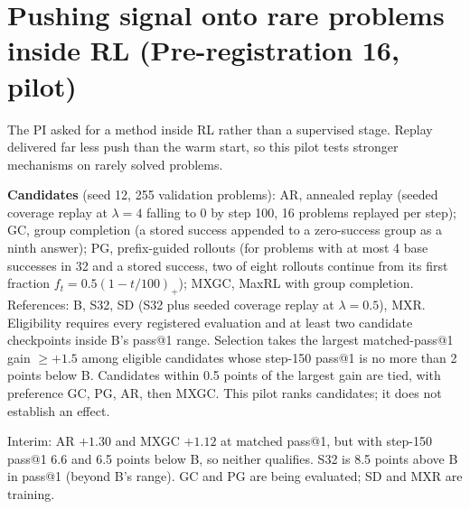 \documentclass[11pt]{article}
\begin{document}
\section{Pushing signal onto rare problems inside RL (Pre-registration 16, pilot)}
\begin{why}
The PI asked for a method inside RL rather than a supervised stage. Replay delivered far less push than the warm start, so this pilot tests stronger mechanisms on rarely solved problems.
\end{why}
\textbf{Candidates} (seed 12, 255 validation problems): AR, annealed replay (seeded coverage replay at $\lambda=4$ falling to 0 by step 100, 16 problems replayed per step); GC, group completion (a stored success appended to a zero-success group as a ninth answer); PG, prefix-guided rollouts (for problems with at most 4 base successes in 32 and a stored success, two of eight rollouts continue from its first fraction $f_t=0.5(1-t/100)_+$); MXGC, MaxRL with group completion. References: B, S32, SD (S32 plus seeded coverage replay at $\lambda=0.5$), MXR. Eligibility requires every registered evaluation and at least two candidate checkpoints inside B's pass@1 range. Selection takes the largest matched-pass@1 gain $\ge+1.5$ among eligible candidates whose step-150 pass@1 is no more than 2 points below B. Candidates within 0.5 points of the largest gain are tied, with preference GC, PG, AR, then MXGC. This pilot ranks candidates; it does not establish an effect.
\begin{found}
Interim: AR $+1.30$ and MXGC $+1.12$ at matched pass@1, but with step-150 pass@1 6.6 and 6.5 points below B, so neither qualifies. S32 is 8.5 points above B in pass@1 (beyond B's range). GC and PG are being evaluated; SD and MXR are training.
\end{found}

\end{document}
